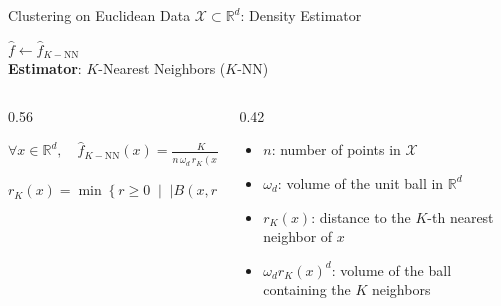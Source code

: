 \documentclass[A4,svgnames,9pt,aspectratio=169]{beamer}
\begin{document}
\begin{frame}{Clustering on Euclidean Data $\mathcal{X} \subset \mathbb{R}^d$: Density Estimator}
    \begin{center}
        \Large $\widehat{f} \leftarrow \widehat{f}_{K-\text{NN}}$ \\[4pt]
        \normalsize \textbf{Estimator}: $K$-Nearest Neighbors ($K$-NN)
    \end{center}
    
    \vspace{0.4cm}
    
    \begin{columns}[c, onlytextwidth]
        \begin{column}{0.56\textwidth}
            \begin{center}
                \vspace{0.2cm}
                {\Large{} $\forall x \in \mathbb{R}^d, \quad \widehat{f}_{K-\text{NN}}(x) = \frac{K}{n \, \omega_d \, r_K(x)^d}$}
                
                \vspace{1.0cm}
                
                {\large{} $r_K(x) = \min \left\{ r \ge 0 \;\middle|\; |B(x,r) \cap \mathcal{X}| \ge K \right\}$}
            \end{center}
        \end{column}
        
        \begin{column}{0.42\textwidth}
            \begin{itemize}
                \setlength{\itemsep}{8pt}
                \item \textbf{$n$}: number of points in $\mathcal{X}$
                \item \textbf{$\omega_d$}: volume of the unit ball in $\mathbb{R}^d$
                \item \textbf{$r_K(x)$}: distance to the $K$-th nearest neighbor of $x$
                \item \textbf{$\omega_d r_K(x)^d$}: volume of the ball containing the $K$ neighbors
            \end{itemize}
        \end{column}
    \end{columns}
\end{frame}
\end{document}
